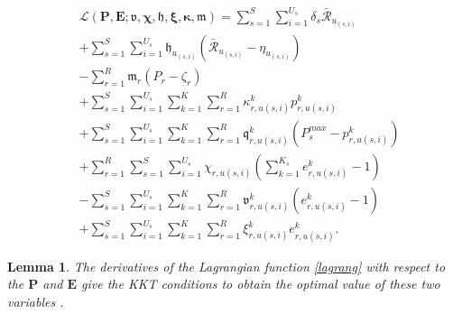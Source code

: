 \documentclass[lettersize,journal]{IEEEtran}
\newtheorem{lemma}{Lemma}
\begin{document}
\begin{equation}\label{lagrang}
\begin{split}
&\mathcal{L}(\boldsymbol{P},\boldsymbol{E}; \boldsymbol{\mathfrak{v}}, \boldsymbol{\chi}, \boldsymbol{\mathfrak{h}}, \boldsymbol{ \xi}, \boldsymbol{ \kappa}, \boldsymbol{\mathfrak{m}})  = \sum\limits_{s=1}^{S} \sum\limits_{i=1}^{U_s}\delta_s\mathcal{\bar{R}}_{u_{(s,i)}}\\
&+\sum\limits_{s=1}^{S} \sum\limits_{i=1}^{U_s}\mathfrak{h}_{u_{(s,i)}} (\mathcal{\bar{R}}_{u_{(s,i)}}-\eta_{u_{(s,i)}})\\
&-  \sum\limits_{r=1}^{R} \mathfrak{m}_{r} (P_{r}- \zeta_r)\\
&+  \sum\limits_{s=1}^{S} \sum\limits_{i=1}^{U_s}\sum\limits_{k=1}^{K} \sum\limits_{r=1}^{R}\kappa^k_{r,u(s,i)}  p^k_{r,u(s,i)}\\
&+  \sum\limits_{s=1}^{S} \sum\limits_{i=1}^{U_s}\sum\limits_{k=1}^{K} \sum\limits_{r=1}^{R}\mathfrak{q}^k_{r,u(s,i)} (P^{max}_{s}- p^k_{r,u(s,i)})\\
&+ \sum\limits_{r=1}^{R}\sum\limits_{s=1}^{S} \sum\limits_{i=1}^{U_s}\chi_{r,u(s,i)}(\sum_{k =1}^{K_s} e^{k}_{r,u(s,i)} -1)\\
&-  \sum\limits_{s=1}^{S} \sum\limits_{i=1}^{U_s}\sum\limits_{k=1}^{K} \sum\limits_{r=1}^{R}\mathfrak{v}^{k}_{r,u(s,i)} (e^{k}_{r,u(s,i)} -1)\\
&+  \sum\limits_{s=1}^{S} \sum\limits_{i=1}^{U_s}\sum\limits_{k=1}^{K} \sum\limits_{r=1}^{R} \xi^{k}_{r,u(s,i)} e^{k}_{r,u(s,i)}.
\end{split}
\end{equation}
\begin{lemma}
The derivatives of the Lagrangian function \eqref{lagrang} with respect to the $\boldsymbol{P}$ and $\boldsymbol{E}$ give the KKT conditions to obtain the optimal value of these two variables \cite{lee2018dynamic,ali2018joint}.
\end{lemma}
\end{document}
